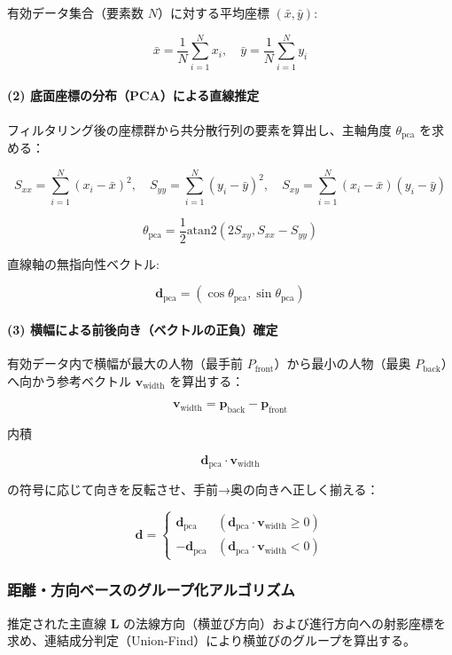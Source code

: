 有効データ集合（要素数 $N$）に対する平均座標 $(\bar{x}, \bar{y})$:

$$\bar{x} = \frac{1}{N} \sum_{i=1}^N x_i, \quad \bar{y} = \frac{1}{N} \sum_{i=1}^N y_i$$

\paragraph{(2) 底面座標の分布（PCA）による直線推定}
フィルタリング後の座標群から共分散行列の要素を算出し、主軸角度 $\theta_{\text{pca}}$ を求める：

$$S_{xx} = \sum_{i=1}^N (x_i - \bar{x})^2, \quad S_{yy} = \sum_{i=1}^N (y_i - \bar{y})^2, \quad S_{xy} = \sum_{i=1}^N (x_i - \bar{x})(y_i - \bar{y})$$

$$\theta_{\text{pca}} = \frac{1}{2} \text{atan2}\left(2 S_{xy}, S_{xx} - S_{yy}\right)$$

直線軸の無指向性ベクトル:

$$\mathbf{d}_{\text{pca}} = (\cos\theta_{\text{pca}}, \sin\theta_{\text{pca}})$$

\paragraph{(3) 横幅による前後向き（ベクトルの正負）確定}
有効データ内で横幅が最大の人物（最手前 $P_{\text{front}}$）から最小の人物（最奥 $P_{\text{back}}$）へ向かう参考ベクトル $\mathbf{v}_{\text{width}}$ を算出する：

$$\mathbf{v}_{\text{width}} = \mathbf{p}_{\text{back}} - \mathbf{p}_{\text{front}}$$

内積

$$\mathbf{d}_{\text{pca}} \cdot \mathbf{v}_{\text{width}}$$

の符号に応じて向きを反転させ、手前→奥の向きへ正しく揃える：

$$\mathbf{d} = \begin{cases} \mathbf{d}_{\text{pca}} & (\mathbf{d}_{\text{pca}} \cdot \mathbf{v}_{\text{width}} \ge 0) \\ -\mathbf{d}_{\text{pca}} & (\mathbf{d}_{\text{pca}} \cdot \mathbf{v}_{\text{width}} < 0) \end{cases}$$

\subsubsection{距離・方向ベースのグループ化アルゴリズム}
推定された主直線 $\mathbf{L}$ の法線方向（横並び方向）および進行方向への射影座標を求め、連結成分判定（Union-Find）により横並びのグループを算出する。

